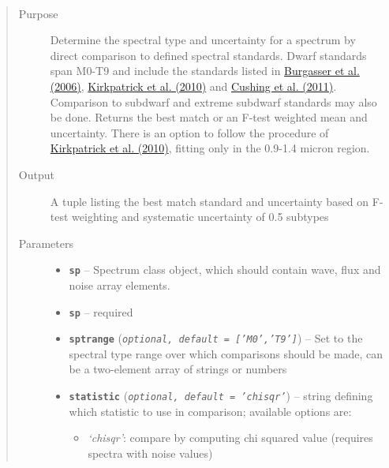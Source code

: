 \documentclass[letterpaper,10pt,english]{sphinxmanual}
\begin{document}

\begin{fulllineitems}
\label{api:splat.classifyByStandard}~\begin{quote}\begin{description}
\item[{Purpose}] \leavevmode
Determine the spectral type and uncertainty for a
spectrum by direct comparison to defined spectral standards.
Dwarf standards span M0-T9 and include the standards listed in
\href{http://adsabs.harvard.edu/abs/2006ApJ...637.1067B}{Burgasser et al. (2006)}, \href{http://adsabs.harvard.edu/abs/2010ApJS..190..100K}{Kirkpatrick et al. (2010)} and \href{http://adsabs.harvard.edu/abs/2011ApJ...743...50C}{Cushing et al. (2011)}.
Comparison to subdwarf and extreme subdwarf standards may also be done.
Returns the best
match or an F-test weighted mean and uncertainty. There is an option
to follow the procedure of \href{http://adsabs.harvard.edu/abs/2010ApJS..190..100K}{Kirkpatrick et al. (2010)}, fitting only in
the 0.9-1.4 micron region.

\item[{Output}] \leavevmode
A tuple listing the best match standard and uncertainty based on F-test weighting and systematic uncertainty of 0.5 subtypes

\item[{Parameters}] \leavevmode\begin{itemize}
\item {} 
\textbf{\texttt{sp}} -- Spectrum class object, which should contain wave, flux and
noise array elements.

\item {} 
\textbf{\texttt{sp}} -- required

\item {} 
\textbf{\texttt{sptrange}} (\emph{\texttt{optional, default = {[}'M0','T9'{]}}}) -- Set to the spectral type range over which comparisons should be made, can be a two-element array of strings or numbers

\item {} 
\textbf{\texttt{statistic}} (\emph{\texttt{optional, default = 'chisqr'}}) -- 
string defining which statistic to use in comparison; available options are:
\begin{itemize}
\item {} 
\emph{`chisqr'}: compare by computing chi squared value (requires spectra with noise values)


\end{itemize}
\end{itemize}
\end{description}
\end{quote}
\end{fulllineitems}
\end{document}
